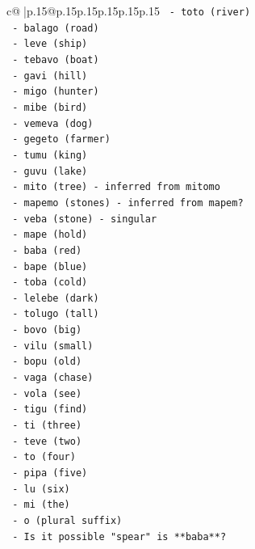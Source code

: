 \documentclass{article}
\begin{document}
{\begin{supertabular}{c@{$\;$}|p{.15\linewidth}@{}p{.15\linewidth}p{.15\linewidth}p{.15\linewidth}p{.15\linewidth}p{.15\linewidth}}
{{{\texttt{      {-} toto (river)} \\
\texttt{      {-} balago (road)} \\
\texttt{      {-} leve (ship)} \\
\texttt{      {-} tebavo (boat)} \\
\texttt{      {-} gavi (hill)} \\
\texttt{      {-} migo (hunter)} \\
\texttt{      {-} mibe (bird)} \\
\texttt{      {-} vemeva (dog)} \\
\texttt{      {-} gegeto (farmer)} \\
\texttt{      {-} tumu (king)} \\
\texttt{      {-} guvu (lake)} \\
\texttt{      {-} mito (tree) {-} inferred from mitomo} \\
\texttt{      {-} mapemo (stones) {-} inferred from mapem?} \\
\texttt{      {-} veba (stone) {-} singular} \\
\texttt{      {-} mape (hold)} \\
\texttt{      {-} baba (red)} \\
\texttt{      {-} bape (blue)} \\
\texttt{      {-} toba (cold)} \\
\texttt{      {-} lelebe (dark)} \\
\texttt{      {-} tolugo (tall)} \\
\texttt{      {-} bovo (big)} \\
\texttt{      {-} vilu (small)} \\
\texttt{      {-} bopu (old)} \\
\texttt{      {-} vaga (chase)} \\
\texttt{      {-} vola (see)} \\
\texttt{      {-} tigu (find)} \\
\texttt{      {-} ti (three)} \\
\texttt{      {-} teve (two)} \\
\texttt{      {-} to (four)} \\
\texttt{      {-} pipa (five)} \\
\texttt{      {-} lu (six)} \\
\texttt{      {-} mi (the)} \\
\texttt{      {-} o (plural suffix)} \\
\texttt{    {-} Is it possible "spear" is **baba**?} \\
}}}
\end{supertabular}}
\end{document}
